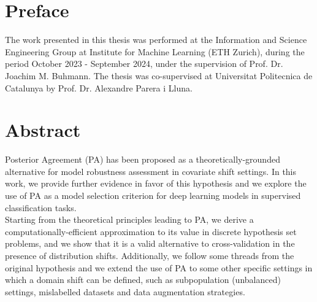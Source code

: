 
\chapter*{Preface}

The work presented in this thesis was performed at the Information and Science Engineering Group at Institute for Machine Learning (ETH Zurich), during the period October 2023 - September 2024, under
the supervision of Prof. Dr. Joachim M. Buhmann. The thesis was co-supervised at Universitat Politecnica de Catalunya by Prof. Dr. Alexandre Parera i Lluna.

 \cleardoublepage


 \setcounter{tocdepth}{2}
 \tableofcontents

 \cleardoublepage


\chapter*{Abstract}

 Posterior Agreement (PA) has been proposed as a theoretically-grounded alternative for model
 robustness assessment in covariate shift settings. In this work, we provide further evidence in favor of
 this hypothesis and we explore the use of PA as a model selection criterion for deep learning models in supervised 
 classification tasks. \\
 
 Starting from the theoretical principles leading to PA, we derive a computationally-efficient approximation to its value in 
 discrete hypothesis set problems, and we show that it is a valid alternative to cross-validation in the presence of distribution shifts. Additionally, we follow some threads from the original hypothesis and we extend the use of PA to some other specific settings 
 in which a domain shift can be defined, such as subpopulation (unbalanced) settings, mislabelled datasets and data augmentation strategies.

 \cleardoublepage


